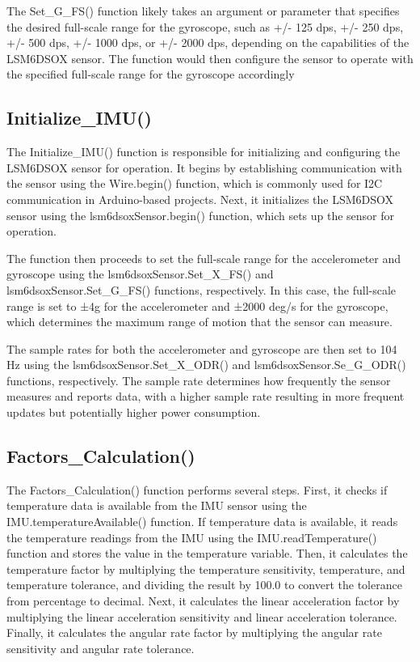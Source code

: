 The Set\_G\_FS() function likely takes an argument or parameter that specifies the desired full-scale range for the gyroscope, such as +/- 125 dps, +/- 250 dps, +/- 500 dps, +/- 1000 dps, or +/- 2000 dps, depending on the capabilities of the LSM6DSOX sensor. The function would then configure the sensor to operate with the specified full-scale range for the gyroscope accordingly

\subsection{Initialize\_IMU()}
The Initialize\_IMU() function is responsible for initializing and configuring the LSM6DSOX sensor for operation. It begins by establishing communication with the sensor using the Wire.begin() function, which is commonly used for I2C communication in Arduino-based projects. Next, it initializes the LSM6DSOX sensor using the lsm6dsoxSensor.begin() function, which sets up the sensor for operation.

The function then proceeds to set the full-scale range for the accelerometer and gyroscope using the lsm6dsoxSensor.Set\_X\_FS() and lsm6dsoxSensor.Set\_G\_FS() functions, respectively. In this case, the full-scale range is set to ±4g for the accelerometer and ±2000 deg/s for the gyroscope, which determines the maximum range of motion that the sensor can measure.

The sample rates for both the accelerometer and gyroscope are then set to 104 Hz using the lsm6dsoxSensor.Set\_X\_ODR() and lsm6dsoxSensor.Se\_G\_ODR() functions, respectively. The sample rate determines how frequently the sensor measures and reports data, with a higher sample rate resulting in more frequent updates but potentially higher power consumption.

\subsection{Factors\_Calculation()}
The Factors\_Calculation() function performs several steps. First, it checks if temperature data is available from the IMU sensor using the IMU.temperatureAvailable() function. If temperature data is available, it reads the temperature readings from the IMU using the IMU.readTemperature() function and stores the value in the temperature variable. Then, it calculates the temperature factor by multiplying the temperature sensitivity, temperature, and temperature tolerance, and dividing the result by 100.0 to convert the tolerance from percentage to decimal. Next, it calculates the linear acceleration factor by multiplying the linear acceleration sensitivity and linear acceleration tolerance. Finally, it calculates the angular rate factor by multiplying the angular rate sensitivity and angular rate tolerance.

